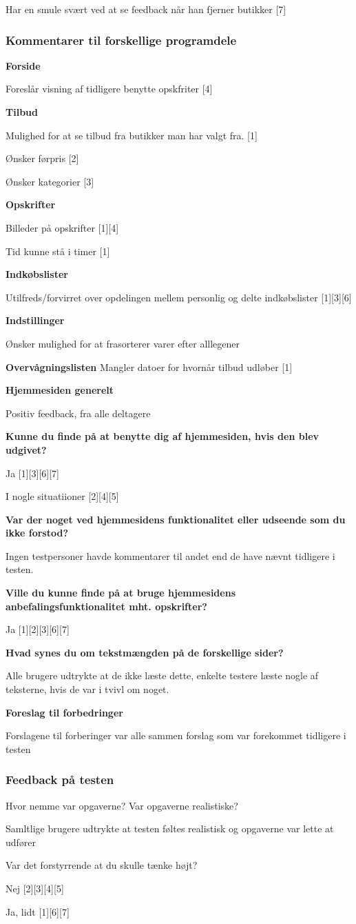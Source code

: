 Har en smule svært ved at se feedback når han fjerner butikker [7]

\subsubsection{Kommentarer til forskellige programdele}
\textbf{Forside}

Foreslår visning af tidligere benytte opskfriter [4]

\textbf{Tilbud}

Mulighed for at se tilbud fra butikker man har valgt fra. [1]

Ønsker førpris [2]
	
Ønsker kategorier [3]

\textbf{Opskrifter}

Billeder på opskrifter [1][4]

Tid kunne stå i timer [1]

\textbf{Indkøbslister}

Utilfreds/forvirret  over opdelingen mellem personlig og delte indkøbslister [1][3][6]

\textbf{Indstillinger}

Ønsker mulighed for at frasorterer varer efter alllegener

\textbf{Overvågningslisten}
Mangler datoer for hvornår tilbud udløber [1]

\textbf{Hjemmesiden generelt}

Positiv feedback, fra alle deltagere

\textbf{Kunne du finde på at benytte dig af hjemmesiden, hvis den blev udgivet?}

Ja [1][3][6][7]

I nogle situatiioner [2][4][5]

\textbf{Var der noget ved hjemmesidens funktionalitet eller udseende som du ikke forstod?}

Ingen testpersoner havde kommentarer til andet end de have nævnt tidligere i testen.

\textbf{Ville du kunne finde på at bruge hjemmesidens anbefalingsfunktionalitet mht. opskrifter?}

Ja [1][2][3][6][7]

\textbf{Hvad synes du om tekstmængden på de forskellige sider?}

Alle brugere udtrykte at de ikke læste dette, enkelte testere læste nogle af teksterne, hvis de var i tvivl om noget.

\textbf{Foreslag til forbedringer}

Forslagene til forberinger var alle sammen forslag som var forekommet tidligere i testen 

\subsubsection{Feedback på testen}
Hvor nemme var opgaverne? Var opgaverne realistiske?

Samltlige brugere udtrykte at testen føltes realistisk og opgaverne var lette at udfører

Var det forstyrrende at du skulle tænke højt?

Nej [2][3][4][5]

Ja, lidt [1][6][7]
